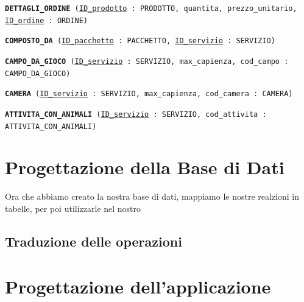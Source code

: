 \documentclass[a4paper,12pt]{report}
\begin{document}
\begin{description}
	\item\texttt{\textbf{DETTAGLI\_ORDINE} (\underline{ID\_prodotto} : PRODOTTO, quantita, prezzo\_unitario, \newline \underline{ID\_ordine} : ORDINE)}
	\item\texttt{\textbf{COMPOSTO\_DA} (\underline{ID\_pacchetto} : PACCHETTO, \underline{ID\_servizio} : SERVIZIO)}
	\item\texttt{\textbf{CAMPO\_DA\_GIOCO} (\underline{ID\_servizio} : SERVIZIO, max\_capienza, \newline cod\_campo : CAMPO\_DA\_GIOCO)}
	\item\texttt{\textbf{CAMERA} (\underline{ID\_servizio} : SERVIZIO, max\_capienza, cod\_camera : CAMERA)}
	\item\texttt{\textbf{ATTIVITA\_CON\_ANIMALI} (\underline{ID\_servizio} : SERVIZIO, \newline cod\_attivita : ATTIVITA\_CON\_ANIMALI)}
\end{description}

\chapter{Progettazione della Base di Dati}
Ora che abbiamo creato la nostra base di dati, mappiamo le nostre realzioni in tabelle, per poi utilizzarle nel nostro

\section{Traduzione delle operazioni}

\chapter{Progettazione dell'applicazione}
\end{document}
